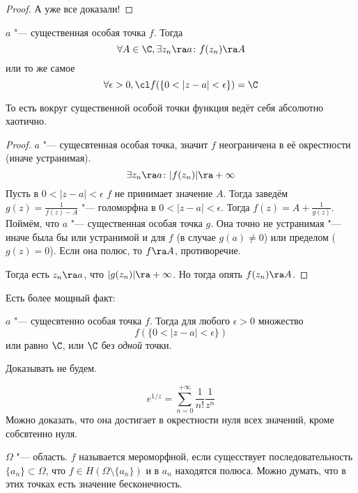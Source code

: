 \begin{proof}
	А уже все доказали!
\end{proof}

\begin{theorem}[Сохоцкого]
	$a$ "--- существенная особая точка $f$.
	Тогда
	\[ \forall A \in \C, \exists z_n \ra a\colon f(z_n) \ra A \]
	или то же самое
	\[ \forall \epsilon > 0, \cl f(\{0 < |z - a| < \epsilon\}) = \C \]
\end{theorem}
То есть вокруг существенной особой точки функция ведёт себя абсолютно хаотично.
\begin{proof}
	$a$ "--- сущесвтенная особая точка, значит $f$ неограничена в её окрестности (иначе устранимая).
	\[ \exists z_n \ra a\colon |f(z_n)| \ra +\infty \]
	Пусть в $0 < |z - a| < \epsilon$ $f$ не принимает значение $A$.
	Тогда заведём $g(z) = \frac1{f(z) - A}$ "--- голоморфна в $0 < |z - a| < \epsilon$.
	Тогда $f(z) = A + \frac1{g(z)}$.
	Поймём, что $a$ "--- существенная особая точка $g$.
	Она точно не устранимая "--- иначе была бы или устранимой и для $f$ (в случае $g(a) \ne 0$) или пределом ($g(z) = 0$).
	Если она полюс, то $f \ra A$, противоречие.

	Тогда есть $z_n \ra a$, что $|g(z_n)| \ra +\infty$.
	Но тогда опять $f(z_n) \ra A$.
\end{proof}

Есть более мощный факт:
\begin{theorem}[Пикара]
	$a$ "--- сущесвтенно особая точка $f$.
	Тогда для любого $\epsilon > 0$ множество
	\[ f(\{0 < |z - a| < \epsilon\}) \]
	или равно $\C$, или $\C$ без \textit{одной} точки.
\end{theorem}
Доказывать не будем.

\begin{exmp}
	\[ e^{1/z} = \sum_{n=0}^{+\infty} \frac1{n!} \frac1{z^n} \]
	Можно доказать, что она достигает в окрестности нуля всех значений, кроме собсвтенно нуля.
\end{exmp}

\begin{Def}
	$\Omega$ "--- область. $f$ называется мероморфной, если сущесствует последовательность $\{a_n\} \subset \Omega$,
	что $f \in H(\Omega \setminus \{a_n\})$ и в $a_n$ находятся полюса.
	Можно думать, что в этих точках есть значение бесконечность.
\end{Def}

